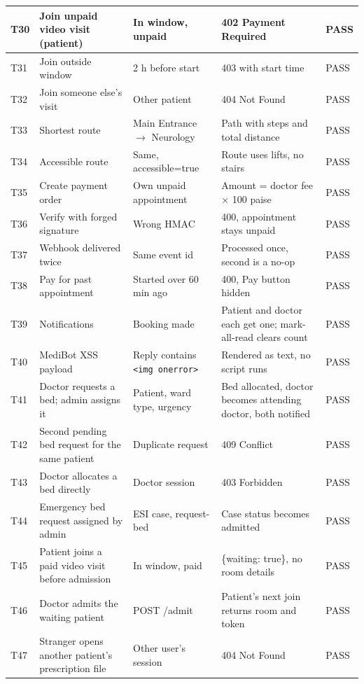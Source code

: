 \begin{longtable}{|C{0.8cm}|L{3.9cm}|L{3.4cm}|L{3.5cm}|C{1.2cm}|}
\hline
T30 & Join unpaid video visit (patient) & In window, unpaid & 402 Payment Required & PASS \\
\hline
T31 & Join outside window & 2 h before start & 403 with start time & PASS \\
\hline
T32 & Join someone else's visit & Other patient & 404 Not Found & PASS \\
\hline
T33 & Shortest route & Main Entrance $\rightarrow$ Neurology & Path with steps and total distance & PASS \\
\hline
T34 & Accessible route & Same, accessible=true & Route uses lifts, no stairs & PASS \\
\hline
T35 & Create payment order & Own unpaid appointment & Amount = doctor fee $\times$ 100 paise & PASS \\
\hline
T36 & Verify with forged signature & Wrong HMAC & 400, appointment stays unpaid & PASS \\
\hline
T37 & Webhook delivered twice & Same event id & Processed once, second is a no-op & PASS \\
\hline
T38 & Pay for past appointment & Started over 60 min ago & 400, Pay button hidden & PASS \\
\hline
T39 & Notifications & Booking made & Patient and doctor each get one; mark-all-read clears count & PASS \\
\hline
T40 & MediBot XSS payload & Reply contains \texttt{<img onerror>} & Rendered as text, no script runs & PASS \\
\hline
T41 & Doctor requests a bed; admin assigns it & Patient, ward type, urgency & Bed allocated, doctor becomes attending doctor, both notified & PASS \\
\hline
T42 & Second pending bed request for the same patient & Duplicate request & 409 Conflict & PASS \\
\hline
T43 & Doctor allocates a bed directly & Doctor session & 403 Forbidden & PASS \\
\hline
T44 & Emergency bed request assigned by admin & ESI case, request-bed & Case status becomes admitted & PASS \\
\hline
T45 & Patient joins a paid video visit before admission & In window, paid & \{waiting: true\}, no room details & PASS \\
\hline
T46 & Doctor admits the waiting patient & POST /admit & Patient's next join returns room and token & PASS \\
\hline
T47 & Stranger opens another patient's prescription file & Other user's session & 404 Not Found & PASS \\

\end{longtable}
